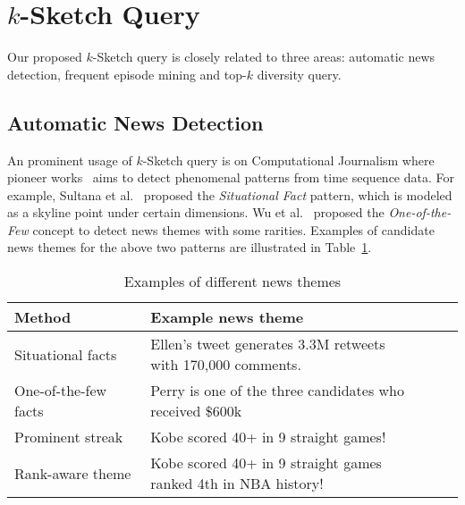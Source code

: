 \section{$k$-Sketch Query}\label{sec:related_work}
Our proposed $k$-Sketch query is closely related
to three areas: automatic news detection, frequent episode mining and top-$k$ diversity query.

\subsection{Automatic News Detection}
An prominent usage of $k$-Sketch query is on Computational
Journalism where pioneer works~\cite{} aims to detect phenomenal patterns from time sequence data. For example, Sultana et al.~\cite{sultana2014incremental} proposed the \emph{Situational Fact} pattern, which is modeled as a skyline point under certain dimensions. Wu et al.~\cite{wu2012one} proposed the \emph{One-of-the-Few} concept to detect news themes with some rarities. Examples of candidate news themes for the above two patterns are illustrated in Table~\ref{tbl:related_works}.


{\renewcommand{\arraystretch}{1.2} 
\begin{table}[h]
\centering
\begin{tabular}{|l|l|}
\hline
\textbf{Method} & \textbf{Example news theme}\\
\hline
Situational facts~\cite{sultana2014incremental} & \pbox{22cm}{\vspace{.3\baselineskip} Ellen's tweet generates 3.3M retweets\\ with 170,000 comments.\vspace{.3\baselineskip}} \\
\hline
One-of-the-few facts~\cite{wu2012one} & \pbox{22cm}{\vspace{.3\baselineskip}Perry is one of the three candidates \\  who received \$600k\vspace{.3\baselineskip}} \\
\hline
Prominent streak~\cite{zhang2014discovering} & Kobe scored 40+ in 9 straight games!  \\
\hline
Rank-aware theme & \pbox{22cm}{\vspace{.3\baselineskip}Kobe scored 40+ in 9 straight games\\ ranked 4th in NBA history!\vspace{.3\baselineskip}} \\
\hline
\end{tabular}
\caption{Examples of different news themes}
\label{tbl:related_works}
\end{table}
}

